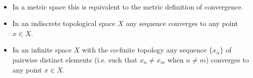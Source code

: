 \begin{example} \
\begin{itemize}
\item In a metric space this is equivalent to the metric definition of convergence.
\item In an indiscrete topological space $X$ any sequence converges to any point $x\in X$.
\item In an infinite space $X$ with the co-finite topology any sequence $\{x_n\}$ of pairwise distinct elements (i.e. such that $x_n\neq x_m$ when $n\neq m$) converges to any point $x\in X$.
\end{itemize}
\end{example}




